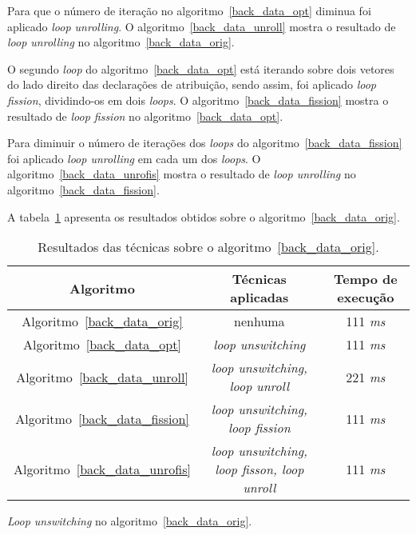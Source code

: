 Para que o número de iteração no algoritmo~\ref{back_data_opt} diminua foi
aplicado \textit{loop unrolling}. O algoritmo~\ref{back_data_unroll} mostra o
resultado de \textit{loop unrolling} no algoritmo~\ref{back_data_orig}.

O segundo \textit{loop} do algoritmo~\ref{back_data_opt} está iterando sobre dois
vetores do lado direito das declarações de atribuição, sendo assim, foi
aplicado \textit{loop fission}, dividindo-os em dois \textit{loops}.
O algoritmo~\ref{back_data_fission} mostra o resultado de \textit{loop fission}
no algoritmo~\ref{back_data_opt}.

Para diminuir o número de iterações dos \textit{loops} do
algoritmo~\ref{back_data_fission} foi aplicado \textit{loop unrolling} em cada um
dos \textit{loops}. O algoritmo~\ref{back_data_unrofis} mostra o resultado de
\textit{loop unrolling} no algoritmo~\ref{back_data_fission}.


A tabela~\ref{tabela_back_data} apresenta os resultados obtidos sobre o
algoritmo~\ref{back_data_orig}.

\begin{table}[H]
  \caption{Resultados das técnicas sobre o algoritmo~\ref{back_data_orig}.}
  \label{tabela_back_data}
\begin{center}
  \begin{tabular}{c|c|c}
    Algoritmo & Técnicas aplicadas & Tempo de execução\\
    \hline
    Algoritmo~\ref{back_data_orig} & nenhuma & 111 \textit{ms} \\
    \hline
    Algoritmo~\ref{back_data_opt} & \textit{loop unswitching} & 111 \textit{ms} \\
    \hline
    Algoritmo~\ref{back_data_unroll} & \textit{loop unswitching, loop unroll} & 221 \textit{ms} \\
    \hline
    Algoritmo~\ref{back_data_fission} & \textit{loop unswitching, loop fission} & 111 \textit{ms} \\
    \hline
  Algoritmo~\ref{back_data_unrofis} & \textit{loop unswitching, loop fisson, loop unroll} & 111 \textit{ms} \\
    \hline
  \end{tabular}
\end{center}
\end{table}



\begin{algorithm}[H]
\caption{\textit{Loop unswitching} no algoritmo~\ref{back_data_orig}.}
\label{back_data_opt}

\end{algorithm}



